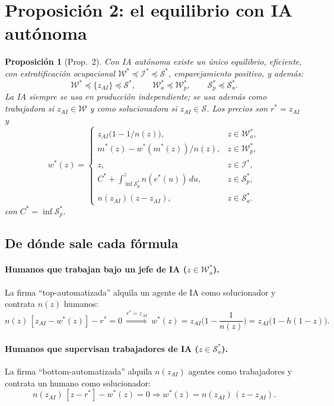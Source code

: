 \documentclass[11pt]{article}
\newtheorem{proposicion}{Proposición}
\theoremstyle{definition}
\theoremstyle{remark}
\newcommand{\zai}{z_{AI}}
\newcommand{\W}{\mathcal W}
\newcommand{\Sset}{\mathcal S}
\newcommand{\I}{\mathcal I}
\newcommand{\below}{\preceq}
\begin{document}
\section{Proposición 2: el equilibrio con IA autónoma}

\begin{proposicion}[Prop.~2]
Con IA autónoma existe un único equilibrio, eficiente, con estratificación ocupacional
$\W^{*}\below\I^{*}\below\Sset^{*}$, emparejamiento positivo, y además:
\[
  \W^{*}\below\{\zai\}\below\Sset^{*},\qquad \W_a^{*}\below\W_p^{*},\qquad \Sset_p^{*}\below \Sset_a^{*}.
\]
La IA siempre se usa en producción independiente; se usa además como trabajadora si $\zai\in\W$ y
como solucionadora si $\zai\in\Sset$. Los precios son $r^{*}=\zai$ y
\[
  w^*(z)=
  \begin{cases}
    \zai\bigl(1-1/n(z)\bigr), & z\in\W_a^*,\\
    m^*(z)-w^*(m^*(z))/n(z), & z\in\W_p^*,\\
    z, & z\in\I^*,\\
    C^*+\displaystyle\int_{\inf \Sset_p^*}^z n(e^*(u))\,du,
       & z\in\Sset_p^*,\\
    n(\zai)(z-\zai), & z\in\Sset_a^*.
  \end{cases}
\]
con $C^{*}=\inf \Sset_p^{*}$.
\end{proposicion}

\subsection{De dónde sale cada fórmula}

\paragraph{Humanos que trabajan bajo un jefe de IA ($z\in\W_a^{*}$).}
La firma ``top-automatizada'' alquila un agente de IA como solucionador y contrata $n(z)$ humanos:
\[
  n(z)\,[\zai-w^{*}(z)]-r^{*}=0
  \ \stackrel{r^{*}=\zai}{\Longrightarrow}\
  w^{*}(z)=\zai\Big(1-\frac{1}{n(z)}\Big)=\zai\big(1-h(1-z)\big).
\]

\paragraph{Humanos que supervisan trabajadores de IA ($z\in \Sset_a^{*}$).}
La firma ``bottom-automatizada'' alquila $n(\zai)$ agentes como trabajadores y contrata un humano
como solucionador:
\[
  n(\zai)\,[z-r^{*}]-w^{*}(z)=0 \Longrightarrow w^{*}(z)=n(\zai)\,(z-\zai).
\]
\end{document}
